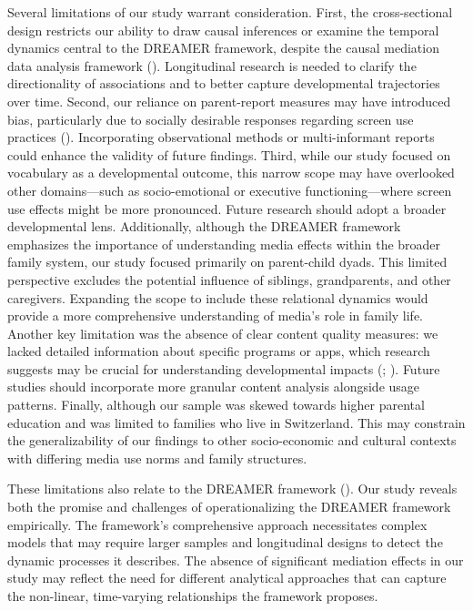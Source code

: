 \documentclass[
  man,
  floatsintext,
  longtable,
  nolmodern,
  notxfonts,
  notimes,
  colorlinks=true,linkcolor=blue,citecolor=blue,urlcolor=blue]{apa7}
\begin{document}
Several limitations of our study warrant consideration. First, the
cross-sectional design restricts our ability to draw causal inferences
or examine the temporal dynamics central to the DREAMER framework,
despite the causal mediation data analysis framework
().
Longitudinal research is needed to clarify the directionality of
associations and to better capture developmental trajectories over time.
Second, our reliance on parent-report measures may have introduced bias,
particularly due to socially desirable responses regarding screen use
practices (). Incorporating observational methods or multi-informant reports
could enhance the validity of future findings. Third, while our study
focused on vocabulary as a developmental outcome, this narrow scope may
have overlooked other domains---such as socio-emotional or executive
functioning---where screen use effects might be more pronounced. Future
research should adopt a broader developmental lens. Additionally,
although the DREAMER framework emphasizes the importance of
understanding media effects within the broader family system, our study
focused primarily on parent-child dyads. This limited perspective
excludes the potential influence of siblings, grandparents, and other
caregivers. Expanding the scope to include these relational dynamics
would provide a more comprehensive understanding of media's role in
family life. Another key limitation was the absence of clear content
quality measures: we lacked detailed information about specific programs
or apps, which research suggests may be crucial for understanding
developmental impacts (;
). Future studies should incorporate more granular
content analysis alongside usage patterns. Finally, although our sample
was skewed towards higher parental education and was limited to families
who live in Switzerland. This may constrain the generalizability of our
findings to other socio-economic and cultural contexts with differing
media use norms and family structures.

These limitations also relate to the DREAMER framework
(). Our
study reveals both the promise and challenges of operationalizing the
DREAMER framework empirically. The framework's comprehensive approach
necessitates complex models that may require larger samples and
longitudinal designs to detect the dynamic processes it describes. The
absence of significant mediation effects in our study may reflect the
need for different analytical approaches that can capture the
non-linear, time-varying relationships the framework proposes.
\end{document}
